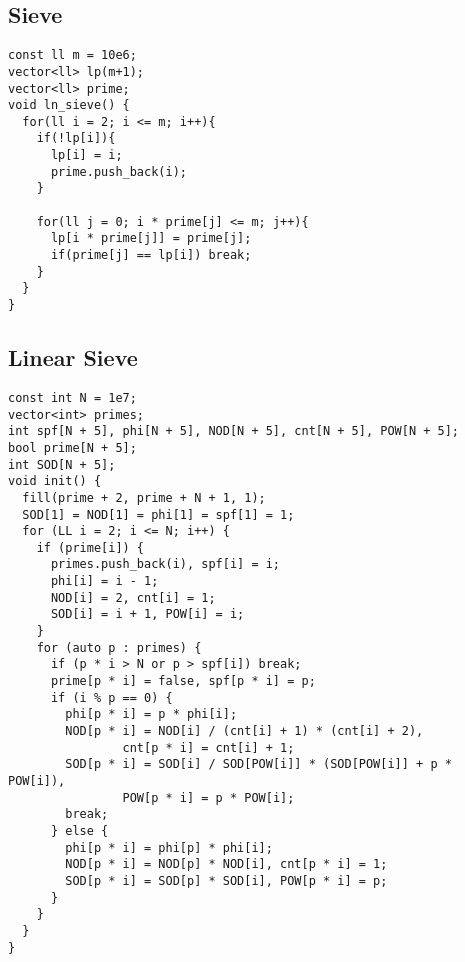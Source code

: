 \documentclass[FSZ,a4paper,onesided]{article}
\begin{document}
\begin{multicols*}{\COLS}
\subsection{Sieve}
\begin{lstlisting}
const ll m = 10e6;
vector<ll> lp(m+1);
vector<ll> prime;
void ln_sieve() {
  for(ll i = 2; i <= m; i++){
    if(!lp[i]){
      lp[i] = i;
      prime.push_back(i);
    }

    for(ll j = 0; i * prime[j] <= m; j++){
      lp[i * prime[j]] = prime[j];
      if(prime[j] == lp[i]) break;
    }
  }
}\end{lstlisting}
\subsection{Linear Sieve}
\begin{lstlisting}
const int N = 1e7;
vector<int> primes;
int spf[N + 5], phi[N + 5], NOD[N + 5], cnt[N + 5], POW[N + 5];
bool prime[N + 5];
int SOD[N + 5];
void init() {
  fill(prime + 2, prime + N + 1, 1);
  SOD[1] = NOD[1] = phi[1] = spf[1] = 1;
  for (LL i = 2; i <= N; i++) {
    if (prime[i]) {
      primes.push_back(i), spf[i] = i;
      phi[i] = i - 1;
      NOD[i] = 2, cnt[i] = 1;
      SOD[i] = i + 1, POW[i] = i;
    }
    for (auto p : primes) {
      if (p * i > N or p > spf[i]) break;
      prime[p * i] = false, spf[p * i] = p;
      if (i % p == 0) {
        phi[p * i] = p * phi[i];
        NOD[p * i] = NOD[i] / (cnt[i] + 1) * (cnt[i] + 2),
                cnt[p * i] = cnt[i] + 1;
        SOD[p * i] = SOD[i] / SOD[POW[i]] * (SOD[POW[i]] + p * POW[i]),
                POW[p * i] = p * POW[i];
        break;
      } else {
        phi[p * i] = phi[p] * phi[i];
        NOD[p * i] = NOD[p] * NOD[i], cnt[p * i] = 1;
        SOD[p * i] = SOD[p] * SOD[i], POW[p * i] = p;
      }
    }
  }
}

\end{lstlisting}

\end{multicols*}
\end{document}
